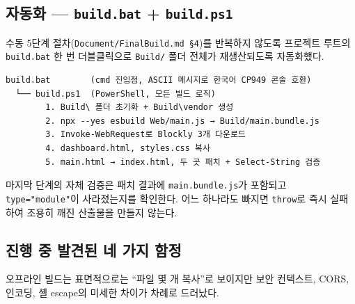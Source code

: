 \documentclass[11pt, oneside]{article}
\begin{document}
\subsection{자동화 --- \texttt{build.bat} + \texttt{build.ps1}}

수동 5단계 절차(\texttt{Document/FinalBuild.md \S 4})를 반복하지 않도록
프로젝트 루트의 \texttt{build.bat} 한 번 더블클릭으로 \texttt{Build/}
폴더 전체가 재생산되도록 자동화했다.

\begin{verbatim}
build.bat        (cmd 진입점, ASCII 메시지로 한국어 CP949 콘솔 호환)
  └── build.ps1  (PowerShell, 모든 빌드 로직)
        1. Build\ 폴더 초기화 + Build\vendor 생성
        2. npx --yes esbuild Web/main.js → Build/main.bundle.js
        3. Invoke-WebRequest로 Blockly 3개 다운로드
        4. dashboard.html, styles.css 복사
        5. main.html → index.html, 두 곳 패치 + Select-String 검증
\end{verbatim}

마지막 단계의 자체 검증은 패치 결과에 \texttt{main.bundle.js}가 포함되고
\texttt{type="module"}이 사라졌는지를 확인한다. 어느 하나라도 빠지면
\texttt{throw}로 즉시 실패하여 조용히 깨진 산출물을 만들지 않는다.

\subsection{진행 중 발견된 네 가지 함정}

오프라인 빌드는 표면적으로는 ``파일 몇 개 복사''로 보이지만 보안
컨텍스트, CORS, 인코딩, 셸 escape의 미세한 차이가 차례로 드러났다.
\end{document}
